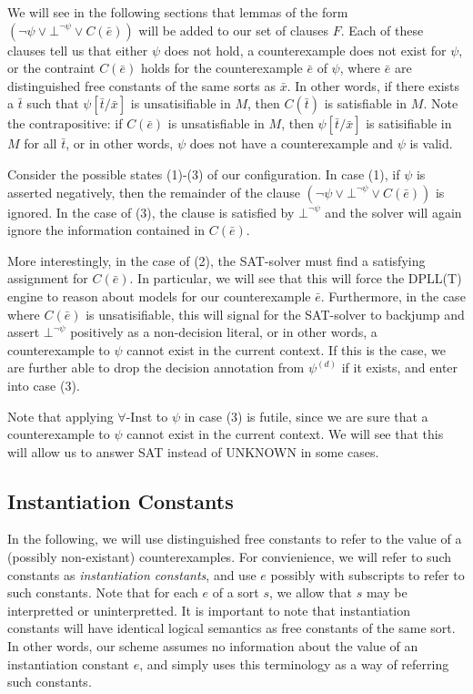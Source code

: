 \documentclass{llncs}
\begin{document}
We will see in the following sections that lemmas of the form $( \neg \psi \vee \bot^{\neg \psi} \vee C(\bar{e}))$ will be added to our set of clauses $F$.
Each of these clauses tell us that either $\psi$ does not hold, a counterexample does not exist for $\psi$, or the contraint $C(\bar{e})$ holds for the counterexample $\bar{e}$ of $\psi$,  where $\bar{e}$ are distinguished free constants of the same sorts as $\bar{x}$.
In other words, if there exists a $\bar{t}$ such that $\psi[\bar{t}/\bar{x}]$ is unsatisifiable in $M$, then $C( \bar{t})$ is satisfiable in $M$.
Note the contrapositive: if $C( \bar{e} )$ is unsatisfiable in $M$, then $\psi[\bar{t}/\bar{x}]$ is satisifiable in $M$ for all $\bar{t}$, or in other words, $\psi$ does not have a counterexample and $\psi$ is valid.

Consider the possible states (1)-(3) of our configuration.
In case (1), if $\psi$ is asserted negatively, then the remainder of the clause $( \neg \psi \vee \bot^{\neg \psi} \vee C(\bar{e}))$ is ignored.
In the case of (3), the clause is satisfied by $\bot^{\neg \psi}$ and the solver will again ignore the information contained in $C(\bar{e})$.

More interestingly, in the case of (2), the SAT-solver must find a satisfying assignment for $C(\bar{e})$.
In particular, we will see that this will force the DPLL(T) engine to reason about models for our counterexample $\bar{e}$.
Furthermore, in the case where $C(\bar{e})$ is unsatisifiable, this will signal for the SAT-solver to backjump and assert $\bot^{\neg \psi}$ positively as a non-decision literal, or in other words, a counterexample to $\psi$ cannot exist in the current context.
If this is the case, we are further able to drop the decision annotation from $\psi^{(d)}$ if it exists, and enter into case (3).

Note that applying $\forall$-Inst to $\psi$ in case (3) is futile, since we are sure that a counterexample to $\psi$ cannot exist in the current context.
We will see that this will allow us to answer SAT instead of UNKNOWN in some cases.

\subsection{Instantiation Constants}

In the following, we will use distinguished free constants to refer to the value of a (possibly non-existant) counterexamples.
For convienience, we will refer to such constants as \emph{instantiation constants}, and use $e$ possibly with subscripts to refer to such constants.
Note that for each $e$ of a sort $s$, we allow that $s$ may be interpretted or uninterpretted.
It is important to note that instantiation constants will have identical logical semantics as free constants of the same sort.
In other words, our scheme assumes no information about the value of an instantiation constant $e$, and simply uses this terminology as a way of referring such constants.
\end{document}
